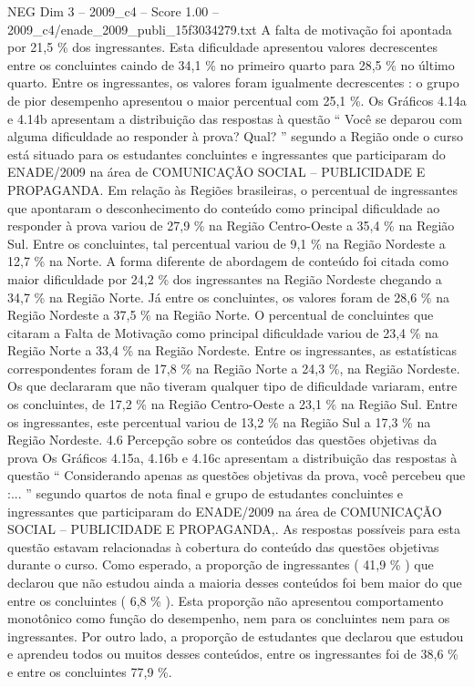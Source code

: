 \begin{textsample}{NEG Dim 3 – 2009\_c4 – Score 1.00 – 2009\_c4/enade\_2009\_publi\_15f3034279.txt}
A falta de motivação foi apontada por 21,5 \% dos ingressantes.
Esta dificuldade apresentou valores decrescentes entre os concluintes caindo de 34,1 \% no primeiro quarto para 28,5 \% no último quarto.
Entre os ingressantes, os valores foram igualmente decrescentes : o grupo de pior desempenho apresentou o maior percentual com 25,1 \%.
Os Gráficos 4.14a e 4.14b apresentam a distribuição das respostas à questão “ Você se deparou com alguma dificuldade ao responder à prova?
Qual? ” segundo a Região onde o curso está situado para os estudantes concluintes e ingressantes que participaram do ENADE/2009 na área de COMUNICAÇÃO SOCIAL – PUBLICIDADE E PROPAGANDA.
Em relação às Regiões brasileiras, o percentual de ingressantes que apontaram o desconhecimento do conteúdo como principal dificuldade ao responder à prova variou de 27,9 \% na Região Centro-Oeste a 35,4 \% na Região Sul.
Entre os concluintes, tal percentual variou de 9,1 \% na Região Nordeste a 12,7 \% na Norte.
A forma diferente de abordagem de conteúdo foi citada como maior dificuldade por 24,2 \% dos ingressantes na Região Nordeste chegando a 34,7 \% na Região Norte.
Já entre os concluintes, os valores foram de 28,6 \% na Região Nordeste a 37,5 \% na Região Norte.
O percentual de concluintes que citaram a Falta de Motivação como principal dificuldade variou de 23,4 \% na Região Norte a 33,4 \% na Região Nordeste.
Entre os ingressantes, as estatísticas correspondentes foram de 17,8 \% na Região Norte a 24,3 \%, na Região Nordeste.
Os que declararam que não tiveram qualquer tipo de dificuldade variaram, entre os concluintes, de 17,2 \% na Região Centro-Oeste a 23,1 \% na Região Sul.
Entre os ingressantes, este percentual variou de 13,2 \% na Região Sul a 17,3 \% na Região Nordeste. 4.6 Percepção sobre os conteúdos das questões objetivas da prova Os Gráficos 4.15a, 4.16b e 4.16c apresentam a distribuição das respostas à questão “ Considerando apenas as questões objetivas da prova, você percebeu que :... ” segundo quartos de nota final e grupo de estudantes concluintes e ingressantes que participaram do ENADE/2009 na área de COMUNICAÇÃO SOCIAL – PUBLICIDADE E PROPAGANDA,.
As respostas possíveis para esta questão estavam relacionadas à cobertura do conteúdo das questões objetivas durante o curso.
Como esperado, a proporção de ingressantes ( 41,9 \% ) que declarou que não estudou ainda a maioria desses conteúdos foi bem maior do que entre os concluintes ( 6,8 \% ).
Esta proporção não apresentou comportamento monotônico como função do desempenho, nem para os concluintes nem para os ingressantes.
Por outro lado, a proporção de estudantes que declarou que estudou e aprendeu todos ou muitos desses conteúdos, entre os ingressantes foi de 38,6 \% e entre os concluintes 77,9 \%.

\end{textsample}
